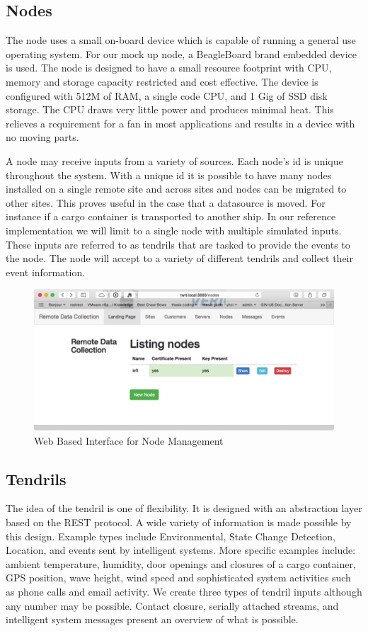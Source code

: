 \subsection{Nodes}

The node uses a small on-board device which is capable of running a general use operating system. For our mock up node, a BeagleBoard\cite{Anonymous:zgMDnVpL} brand embedded device is used.  The node is designed to have a small resource footprint with CPU, memory and storage capacity restricted and cost effective.  The device is configured with 512M of RAM, a single code CPU, and 1 Gig of SSD disk storage.  The CPU draws very little power and produces minimal heat.  This relieves a requirement for a fan in most applications and results in a device with no moving parts.  

A node may receive inputs from a variety of sources.  Each node's id is unique throughout the system.  With a unique id it is possible to have many nodes installed on a single remote site and across sites and nodes can be migrated to other sites. This proves useful in the case that a datasource is moved. For instance if a cargo container is transported to another ship. 
In our reference implementation we will limit to a single node with multiple simulated inputs.  These inputs are referred to as tendrils that are tasked to provide the events to the node.  The node will accept to a variety of different tendrils and collect their event information.  

\begin{figure}
    \centering
    \includegraphics[scale=.9, angle=0]{Figures/interfaceNodes}
    \caption[Nodes Interface]{Web Based Interface for Node Management}
    \label{fig:interfaceNodes}
\end{figure}

\subsection{Tendrils}
The idea of the tendril is one of flexibility. 
It is designed with an abstraction layer based on the REST protocol. A wide variety of information is made possible by this design. 
Example types include Environmental, State Change Detection, Location, and events sent by intelligent systems.  
More specific examples include: ambient temperature, humidity, door openings and closures of a cargo container, GPS position, wave height, wind speed and sophisticated system activities such as phone calls and email activity. We create three types of tendril inputs although any number may be possible. Contact closure, serially attached streams, and intelligent system messages present an overview of what is possible. 
